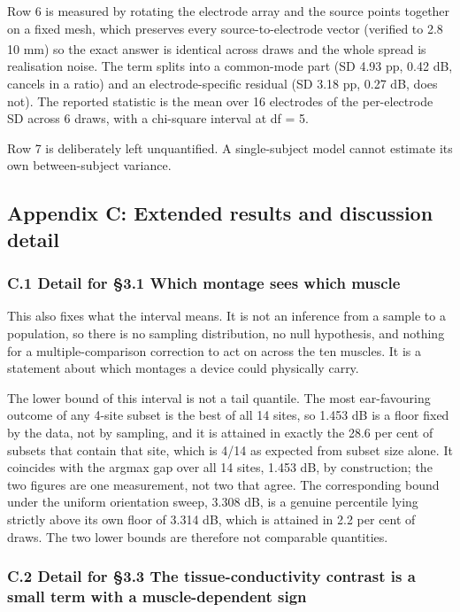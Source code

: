 \documentclass[manuscript,review,anonymous]{acmart}
\begin{document}
Row 6 is measured by rotating the electrode array and the source points together
on a fixed mesh, which preserves every source-to-electrode vector (verified to
2.8 \texttimes{} 10\textsuperscript{} mm) so the exact answer is identical across draws and the whole
spread is realisation noise. The term splits into a common-mode part (SD
4.93 pp, 0.42 dB, cancels in a ratio) and an electrode-specific residual (SD
3.18 pp, 0.27 dB, does not). The reported statistic is the mean over 16
electrodes of the per-electrode SD across 6 draws, with a chi-square interval at
df = 5.

Row 7 is deliberately left unquantified. A single-subject model cannot estimate
its own between-subject variance.

\subsection{Appendix C: Extended results and discussion detail}\label{appendix-c-extended-results-and-discussion-detail}

\subsubsection{C.1 Detail for \S{}3.1 Which montage sees which muscle}\label{c.1-detail-for-3.1-which-montage-sees-which-muscle}

This also fixes what the interval means. It is not an inference from a sample to
a population, so there is no sampling distribution, no null hypothesis, and
nothing for a multiple-comparison correction to act on across the ten muscles.
It is a statement about which montages a device could physically carry.

The lower bound of this interval is not a tail quantile. The most ear-favouring
outcome of any 4-site subset is the best of all 14 sites, so \textminus{}1.453 dB is a
floor fixed by the data, not by sampling, and it is attained in exactly the 28.6
per cent of subsets that contain that site, which is 4/14 as expected from
subset size alone. It coincides with the argmax gap over all 14 sites, \textminus{}1.453
dB, by construction; the two figures are one measurement, not two that agree.
The corresponding bound under the uniform orientation sweep, \textminus{}3.308 dB, is a
genuine percentile lying strictly above its own floor of \textminus{}3.314 dB, which is
attained in 2.2 per cent of draws. The two lower bounds are therefore not
comparable quantities.

\subsubsection{C.2 Detail for \S{}3.3 The tissue-conductivity contrast is a small term with a muscle-dependent sign}\label{c.2-detail-for-3.3-the-tissue-conductivity-contrast-is-a-small-term-with-a-muscle-dependent-sign}
\end{document}
